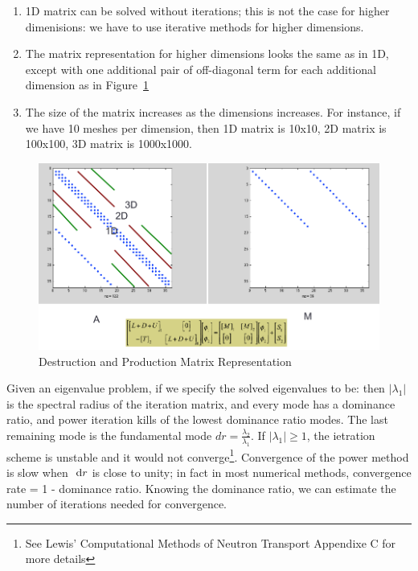 \documentclass{school-22.211-notes}
\begin{document}
\begin{enumerate}
\item 1D matrix can be solved without iterations; this is not the case for higher dimenisions: we have to use iterative methods for higher dimensions. 
\item The matrix representation for higher dimensions looks the same as in 1D, except with one additional pair of off-diagonal term for each additional dimension as in Figure~\ref{matrix-shape}
\item The size of the matrix increases as the dimensions increases. For instance, if we have 10 meshes per dimension, then 1D matrix is 10x10, 2D matrix is 100x100, 3D matrix is 1000x1000.
\end{enumerate}
\begin{figure}[ht]
  \centering
  \includegraphics[width=5in]{images/dfs/matrix_multidimension.png}
  \caption{Destruction and Production Matrix Representation} \label{matrix-shape}
\end{figure}

\clearpage
{}
Given an eigenvalue problem, if we specify the solved eigenvalues to be:
then $|\lambda_1|$ is the spectral radius of the iteration matrix, and every mode has a dominance ratio,
and power iteration kills of the lowest dominance ratio modes. The last remaining mode is the fundamental mode $dr = \frac{\lambda_2}{\lambda_1}$. If $|\lambda_1| \ge 1$, the ietration scheme is unstable and it would not converge\footnote{See Lewis' Computational Methods of Neutron Transport Appendixe C for more details}. Convergence of the power method is slow when $\mbox{ }\mathrm{d} r$ is close to unity; in fact in most numerical methods, convergence rate = 1 - dominance ratio. Knowing the dominance ratio, we can estimate the number of iterations needed for convergence. 
\end{document}
